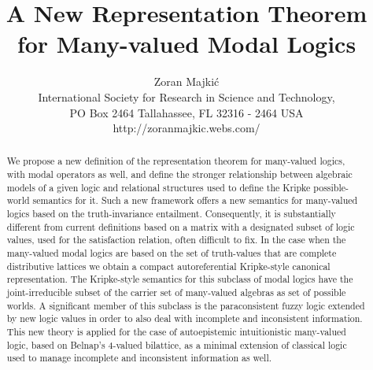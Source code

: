 \documentclass[10pt,twocolumn]{article}
\begin{document}
\title{ A New Representation Theorem for Many-valued Modal Logics}



\author{Zoran Majki\'c\\
 International Society for Research in Science and Technology,\\
 PO Box 2464 Tallahassee, FL 32316 - 2464 USA\\
 http://zoranmajkic.webs.com/
}



\maketitle \thispagestyle{empty}
\begin{abstract}
We propose a new definition of the representation theorem for
many-valued   logics,  with modal operators as well, and define the
stronger relationship between algebraic models of a given logic  and
relational structures used to define the Kripke possible-world
semantics for it. Such a new framework offers  a new semantics for
many-valued logics
based on the truth-invariance entailment. Consequently, it is
substantially different from current definitions based on
a matrix with a designated subset
of logic values,  used for the satisfaction relation, often
difficult to fix. In the case when the many-valued modal logics are
based on the set of truth-values that are complete distributive
lattices we obtain a compact autoreferential Kripke-style canonical
representation.  The Kripke-style semantics for this subclass of
modal logics have the joint-irreducible subset of the carrier set of
many-valued algebras as set of possible worlds. A significant member
of this subclass is the paraconsistent fuzzy logic extended by new
logic values in order to also deal with incomplete and inconsistent
information. This new theory is applied for the case of
autoepistemic intuitionistic many-valued logic, based on Belnap's
4-valued bilattice, as a minimal extension of classical logic used
to manage incomplete and inconsistent information as well.
\end{abstract}
\end{document}
